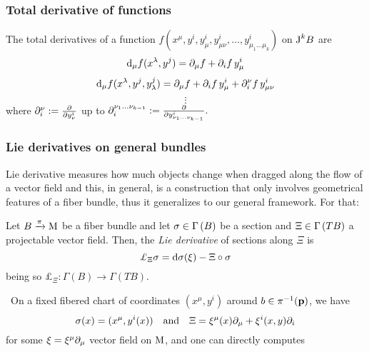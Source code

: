 \subsubsection{Total derivative of functions}
The total derivatives of a function $f(x^\mu,y^i,y^i_\mu,y^i_{\mu\nu},\hdots,y^i_{\mu_1\hdots\mu_k})$ on $\text{\normalfont J}^kB$ are
$$\text{\normalfont d}_\mu f(x^\lambda,y^j)=\partial_\mu f+\partial_i f\,y^i_\mu$$
$$\text{\normalfont d}_\mu f(x^\lambda,y^j,y^j_\lambda)=\partial_\mu f+\partial_i f\,y^i_\mu+\partial_i^\nu f\,y^i_{\mu\nu}$$
$$\vdots$$
where $\partial_i^\nu:=\frac{\partial}{\partial y^i_\nu}$ up to $\partial_i^{\nu_1\hdots\nu_{k-1}}:=\frac{\partial}{\partial y^i_{\nu_1\hdots\nu_{k-1}}}.$

\subsubsection{Lie derivatives on general bundles}
Lie derivative measures how much objects change when dragged along the flow of a vector field and this, in general, is a construction that only involves geometrical features of a fiber bundle, thus it generalizes to our general framework. For that:

\begin{defi}
    Let $B\xrightarrow{\pi}\text{\normalfont M}$ be a fiber bundle and let $\sigma\in\Gamma\left(B\right)$ be a section and $\Xi\in\Gamma\left(TB\right)$ a projectable vector field. Then, the \emph{Lie derivative} of sections along $\Xi$ is
    $$\pounds_\Xi\sigma=\d\sigma(\xi)-\Xi\circ\sigma$$
    being so $\pounds_\Xi:\Gamma(B)\to\Gamma(TB)$.
\end{defi}
\,\newline
On a fixed fibered chart of coordinates $(x^\mu,y^i)$ around $b\in\pi^{-1}(\mathbf{p})$, we have
$$\sigma(x)=(x^\mu,y^i(x))\quad\text{and}\quad\Xi=\xi^\mu(x)\partial_\mu+\xi^i(x,y)\partial_i$$
for some $\xi=\xi^\mu\partial_\mu$ vector field on $\text{\normalfont M}$, and one can directly computes


